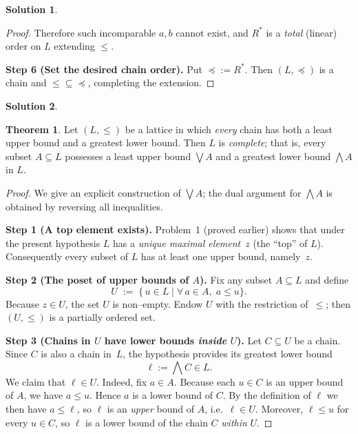 \documentclass[12pt]{article}
\theoremstyle{definition} %
\newtheorem{solution}{Solution}
\newtheorem{theorem}{Theorem}
\theoremstyle{plain} %
\begin{document}
\begin{solution}
\begin{proof}
        \smallskip
        Therefore such incomparable $a,b$ cannot exist, and $R^\ast$ is a
        \emph{total} (linear) order on $L$ extending $\le$.
        
        \bigskip
        \textbf{Step 6 (Set the desired chain order).}
        Put $\preceq:=R^\ast$.
        Then $(L,\preceq)$ is a chain and $\le\subseteq\preceq$, completing
        the extension.
        
        \end{proof}
    \end{solution}

    \begin{solution}
      \begin{theorem}
        \label{thm:lattice-complete}
        Let $(L,\le)$ be a lattice in which \emph{every} chain
        has both a least upper bound and a greatest lower bound.
        Then $L$ is \emph{complete}; that is, every subset
        $A\subseteq L$ possesses a least upper bound
        $\displaystyle\bigvee A$ and a greatest lower bound
        $\displaystyle\bigwedge A$ in $L$.
        \end{theorem}
        
        \begin{proof}
        We give an explicit construction of $\bigvee A$;
        the dual argument for $\bigwedge A$ is obtained by
        reversing all inequalities.
        
        \smallskip
        \textbf{Step 1 (A top element exists).}
        Problem~1 (proved earlier) shows that under the
        present hypothesis $L$ has a
        \emph{unique maximal element}~$z$ (the “top” of $L$).
        Consequently every subset of $L$ has at least one
        upper bound, namely~$z$.
        
        \smallskip
        \textbf{Step 2 (The poset of upper bounds of $A$).}
        Fix any subset $A\subseteq L$ and define
        \[
          U\;:=\;
          \bigl\{\,u\in L \mid \forall\,a\in A,\; a\le u\bigr\}.
        \]
        Because $z\in U$, the set $U$ is non–empty.
        Endow $U$ with the restriction of~$\le$;
        then $(U,\le)$ is a partially ordered set.
        
        \smallskip
        \textbf{Step 3 (Chains in $U$ have lower bounds \emph{inside} $U$).}
        Let $C\subseteq U$ be a chain.
        Since $C$ is also a chain in~$L$, the hypothesis
        provides its greatest lower bound
        \[
          \ell := \bigwedge C \in L.
        \]
        We claim that $\ell\in U$.
        Indeed, fix $a\in A$.
        Because each $u\in C$ is an upper bound of $A$, we have $a\le u$.
        Hence $a$ is a lower bound of $C$.
        By the definition of $\ell$ we then have $a\le\ell$,
        so $\ell$ is an \emph{upper} bound of $A$, i.e.\ $\ell\in U$.
        Moreover, $\ell\le u$ for every $u\in C$,
        so $\ell$ is a lower bound of the chain $C$ \emph{within} $U$.
        

\end{proof}
\end{solution}
\end{document}
